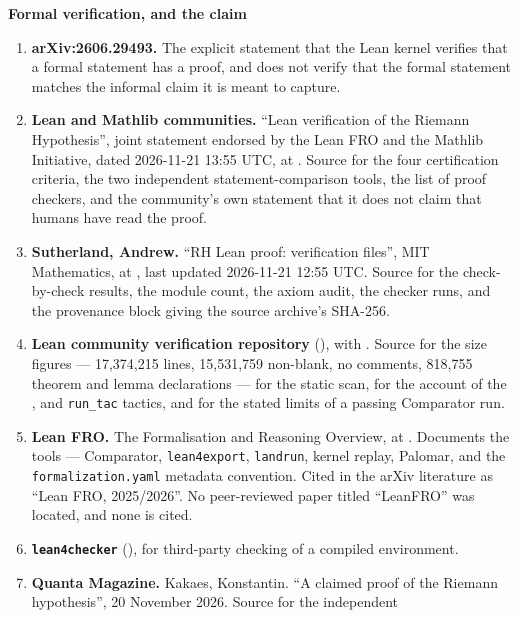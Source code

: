 \vspace{8pt}
{\sffamily\bfseries\small Formal verification, and the claim}

\begin{enumerate}[leftmargin=1.4em,itemsep=4pt,start=30]
\item \textbf{arXiv:2606.29493.} The explicit statement that the Lean kernel
verifies that a formal statement has a proof, and does not verify that the
formal statement matches the informal claim it is meant to capture.
\item \textbf{Lean and Mathlib communities.} ``Lean verification of the
Riemann Hypothesis'', joint statement endorsed by the Lean FRO and the
Mathlib Initiative, dated 2026-11-21 13:55 UTC, at
. Source
for the four certification criteria, the two independent statement-comparison
tools, the list of proof checkers, and the community's own statement that it
does not claim that humans have read the proof.
\item \textbf{Sutherland, Andrew.} ``RH Lean proof: verification files'', MIT
Mathematics, at , last updated 2026-11-21
12:55 UTC. Source for the check-by-check results, the module count, the
axiom audit, the checker runs, and the provenance block giving the source
archive's SHA-256.
\item \textbf{Lean community verification repository}
(), with
. Source for the size figures --- 17{,}374{,}215
lines, 15{,}531{,}759 non-blank, no comments, 818{,}755 theorem and lemma
declarations --- for the static scan, for the account of the ,
 and \texttt{run\_tac} tactics, and for the stated limits of a
passing Comparator run.
\item \textbf{Lean FRO.} The Formalisation and Reasoning Overview, at
. Documents the tools --- Comparator,
\texttt{lean4export}, \texttt{landrun}, kernel replay, Palomar, and the
\texttt{formalization.yaml} metadata convention. Cited in the arXiv
literature as ``Lean FRO, 2025/2026''. No peer-reviewed paper titled
``LeanFRO'' was located, and none is cited.
\item \textbf{\texttt{lean4checker}} (),
for third-party checking of a compiled environment.
\item \textbf{Quanta Magazine.} Kakaes, Konstantin. ``A claimed proof of the
Riemann hypothesis'', 20 November 2026. Source for the independent

\end{enumerate}
